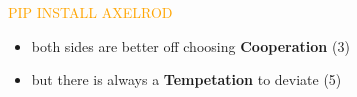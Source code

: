 \documentclass[usenames,dvipsnames,t]{beamer}
\begin{document}
\begin{frame}[fragile]

\begin{columns}
  \begin{column}{.55\linewidth}
   \vspace{1cm}

    \centering
    \Huge\textcolor{orange}{PIP \hspace{2cm} INSTALL \hspace{2cm} AXELROD}
    \Large{
    \begin{multicols}{2}
    \begin{itemize}
      \item both sides are better off choosing \textbf{Cooperation} (3)
      \item but there is always a \textbf{Tempetation} to deviate (5)
    \end{itemize}
    \end{multicols}
    }
  \end{column}
  \begin{column}{.25\linewidth}

    \centering
   
  \end{column}


  \end{columns}
  \begin{columns}
    \begin{column}{.25\linewidth}
   \vspace{1cm}


\end{column}
\end{columns}
\end{frame}
\end{document}
